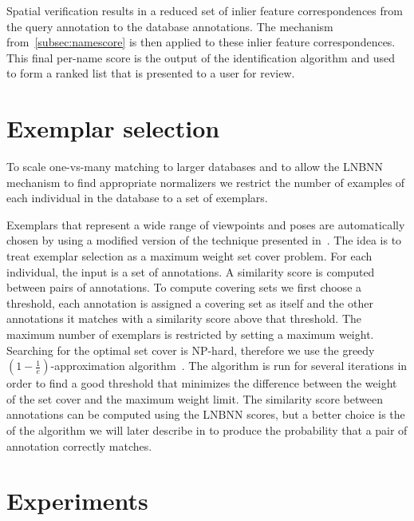         Spatial verification results in a reduced set of inlier feature correspondences from the query annotation
        to the database annotations. The \namescoring{} mechanism from~\cref{subsec:namescore} is then applied to
        these inlier feature correspondences. This final per-name score is the output of the identification
        algorithm and used to form a ranked list that is presented to a user for review.


\FloatBarrier{}
\section{Exemplar selection}\label{sec:exempselect}
    To scale one-vs-many matching to larger databases and to allow the LNBNN mechanism to find appropriate
    normalizers we restrict the number of examples of each individual in the database to a set of exemplars.

    Exemplars that represent a wide range of viewpoints and poses are automatically chosen by using a modified
    version of the technique presented in~\cite{oddone_mobile_2016}. The idea is to treat exemplar selection as a
    maximum weight set cover problem. For each individual, the input is a set of annotations. A similarity score is
    computed between pairs of annotations. To compute covering sets we first choose a threshold, each annotation is
    assigned a covering set as itself and the other annotations it matches with a similarity score above that
    threshold. The maximum number of exemplars is restricted by setting a maximum weight. Searching for the optimal
    set cover is NP-hard, therefore we use the greedy %
    $(1 - \frac{1}{e})$-approximation algorithm~\cite{michael_guide_1979}. The algorithm is run for several
    iterations in order to find a good threshold that minimizes the difference between the weight of the set cover
    and the maximum weight limit. The similarity score between annotations can be computed using the LNBNN scores,
    but a better choice is the of the algorithm we will later describe in  to produce the
    probability that a pair of annotation correctly matches.


\section{Experiments}\label{sec:rankexpt}

